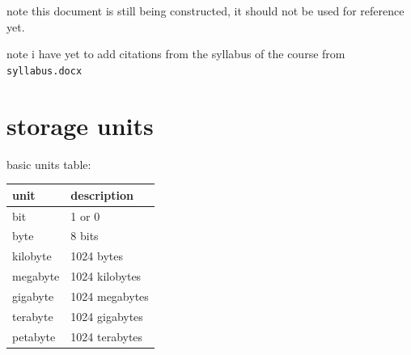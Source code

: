 \documentclass[a4paper,12pt]{article}
\begin{document}
\newenvironment{note}
  {\begin{bclogo}[logo=\bcinfo, couleurBarre=orange, couleur=lightgray]{ note}}
  {\end{bclogo}}
\newenvironment{attention}
  {\begin{bclogo}[logo=\bcattention, couleurBarre=red, noborder=true, 
                couleur=red!15]{Important!}}
  {\end{bclogo}}

\begin{note}
this document is still being constructed, it should not be used for reference yet.\\
\end{note}

\begin{note}
i have yet to add citations from the syllabus of the course from \texttt{syllabus.docx}\\
\end{note}

\section{storage units}
\label{sec:org2981573}
basic units table:\\
\begin{center}
\begin{tabular}{ll}
unit & description\\
\hline
bit & 1 or 0\\
byte & 8 bits\\
kilobyte & 1024 bytes\\
megabyte & 1024 kilobytes\\
gigabyte & 1024 megabytes\\
terabyte & 1024 gigabytes\\
petabyte & 1024 terabytes\\
\end{tabular}
\end{center}
\end{document}
